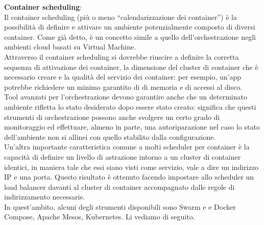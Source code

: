 \textbf{Container scheduling}:\\
Il container scheduling (più o meno “calendarizzazione dei container”) è la possibilità di definire e attivare un ambiente potenzialmente composto di diversi container. Come già detto, è un concetto simile a quello dell’orchestrazione negli ambienti cloud basati su Virtual Machine.\\
Attraverso il container scheduling si dovrebbe riuscire a definire la corretta sequenza di attivazione dei container, la dimensione del cluster di container che è necessario creare e la qualità del servizio dei container: per esempio, un’app potrebbe richiedere un minimo garantito di di memoria e di accessi al disco.\\
Tool avanzati per l’orchestrazione devono garantire anche che un determinato ambiente rifletta lo stato desiderato dopo essere stato creato: significa che questi strumenti di orchestrazione possono anche svolgere un certo grado di monitoraggio ed effettuare, almeno in parte, una autoriparazione nel caso lo stato dell’ambiente non si allinei con quello stabilito dalla configurazione.\\
Un’altra importante caratteristica comune a molti scheduler per container è la capacità di definire un livello di astrazione intorno a un cluster di container identici, in maniera tale che essi siano visti come servizio, vale a dire un indirizzo IP e una porta. Questo risultato è ottenuto facendo impostare allo scheduler un load balancer davanti al cluster di container accompagnato dalle regole di indirizzamento necessarie.\\
In quest’ambito, alcuni degli strumenti disponibili sono Swarm e e Docker Compose, Apache Mesos, Kubernetes. Li vediamo di seguito.
